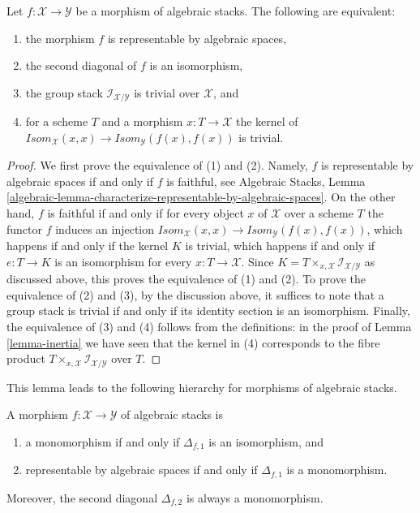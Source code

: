 \begin{lemma}
\label{lemma-second-diagonal}
Let $f : \mathcal{X} \to \mathcal{Y}$ be a morphism of algebraic stacks.
The following are equivalent:
\begin{enumerate}
\item the morphism $f$ is representable by algebraic spaces,
\item the second diagonal of $f$ is an isomorphism,
\item the group stack $ \mathcal{I}_{\mathcal{X}/\mathcal{Y}}$
is trivial over $\mathcal X$, and
\item for a scheme $T$ and a morphism $x : T \to \mathcal{X}$
the kernel of $\mathit{Isom}_\mathcal{X}(x, x) \to
\mathit{Isom}_\mathcal{Y}(f(x), f(x))$ is trivial.
\end{enumerate}
\end{lemma}

\begin{proof}
We first prove the equivalence of (1) and (2).
Namely, $f$ is representable by algebraic spaces if and only if $f$ is
faithful, see
Algebraic Stacks,
Lemma \ref{algebraic-lemma-characterize-representable-by-algebraic-spaces}.
On the other hand, $f$ is faithful if and only if for every object $x$
of $\mathcal{X}$ over a scheme $T$ the functor $f$ induces an injection
$\mathit{Isom}_\mathcal{X}(x, x) \to
\mathit{Isom}_\mathcal{Y}(f(x), f(x))$,
which happens if and only if the kernel $K$ is trivial, which happens if and
only if $e : T \to K$ is an isomorphism for every $x : T \to \mathcal{X}$.
Since $K = T \times_{x, \mathcal{X}} \mathcal{I}_{\mathcal{X}/\mathcal{Y}}$
as discussed above, this proves the equivalence of (1) and (2). To prove
the equivalence of (2) and (3), by the discussion above, it suffices to
note that a group stack is trivial if and only if its identity section
is an isomorphism. Finally, the equivalence of (3) and (4) follows
from the definitions: in the proof of Lemma \ref{lemma-inertia}
we have seen that the kernel in (4) corresponds to the fibre product
$T \times_{x, \mathcal{X}} \mathcal{I}_{\mathcal{X}/\mathcal{Y}}$ over $T$.
\end{proof}

\noindent
This lemma leads to the following hierarchy for
morphisms of algebraic stacks.

\begin{lemma}
\label{lemma-hierarchy}
A morphism $f : \mathcal{X} \to \mathcal{Y}$ of algebraic stacks is
\begin{enumerate}
\item a monomorphism if and only if $\Delta_{f, 1}$ is an isomorphism, and
\item representable by algebraic spaces if and only if $\Delta_{f, 1}$
is a monomorphism.
\end{enumerate}
Moreover, the second diagonal $\Delta_{f, 2}$ is always a monomorphism.
\end{lemma}


